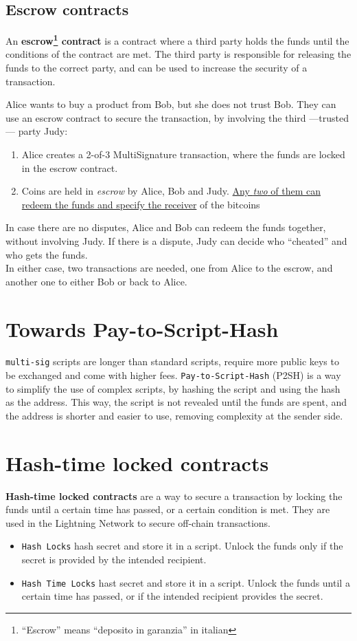 \subsection{Escrow contracts}
An \textbf{escrow\footnote{``Escrow'' means ``deposito in garanzia'' in italian} contract} is a contract where a third party holds the funds until the conditions of the contract are met. The third party is responsible for releasing the funds to the correct party, and can be used to increase the security of a transaction.

Alice wants to buy a product from Bob, but she does not trust Bob. They can use an escrow contract to secure the transaction, by involving the third ---trusted--- party Judy:
\begin{enumerate}
   \item Alice creates a 2-of-3 MultiSignature transaction, where the funds are locked in the escrow contract.
   \item Coins are held in \textit{escrow} by Alice, Bob and Judy. \ul{Any \textit{two} of them can redeem the funds and specify the receiver} of the bitcoins
\end{enumerate}
In case there are no disputes, Alice and Bob can redeem the funds together, without involving Judy. If there is a dispute, Judy can decide who ``cheated'' and who gets the funds.\\
In either case, two transactions are needed, one from Alice to the escrow, and another one to either Bob or back to Alice.

\section{Towards Pay-to-Script-Hash}

\texttt{multi-sig} scripts are longer than standard scripts, require more public keys to be exchanged and come with higher fees.
\texttt{Pay-to-Script-Hash} (P2SH) is a way to simplify the use of complex scripts, by hashing the script and using the hash as the address. This way, the script is not revealed until the funds are spent, and the address is shorter and easier to use, removing complexity at the sender side.

\section{Hash-time locked contracts}
\textbf{Hash-time locked contracts} are a way to secure a transaction by locking the funds until a certain time has passed, or a certain condition is met. They are used in the Lightning Network to secure off-chain transactions.
\begin{itemize}
   \item \texttt{Hash Locks} hash secret and store it in a script. Unlock the funds only if the secret is provided by the intended recipient.
   \item \texttt{Hash Time Locks} hast secret and store it in a script. Unlock the funds until a certain time has passed, or if the intended recipient provides the secret.
\end{itemize}

